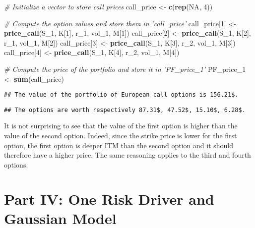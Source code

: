 \documentclass[]{article}
\newenvironment{Shaded}{\begin{snugshade}}{\end{snugshade}}
\newcommand{\CommentTok}[1]{\textcolor[rgb]{0.56,0.35,0.01}{\textit{#1}}}
\newcommand{\DecValTok}[1]{\textcolor[rgb]{0.00,0.00,0.81}{#1}}
\newcommand{\KeywordTok}[1]{\textcolor[rgb]{0.13,0.29,0.53}{\textbf{#1}}}
\newcommand{\NormalTok}[1]{#1}
\newcommand{\OtherTok}[1]{\textcolor[rgb]{0.56,0.35,0.01}{#1}}
\newcommand{\StringTok}[1]{\textcolor[rgb]{0.31,0.60,0.02}{#1}}
\begin{document}
\begin{Shaded}
\begin{Highlighting}[]
\CommentTok{# Initialize a vector to store call prices}
\NormalTok{call_price <-}\StringTok{ }\KeywordTok{c}\NormalTok{(}\KeywordTok{rep}\NormalTok{(}\OtherTok{NA}\NormalTok{, }\DecValTok{4}\NormalTok{))}

\CommentTok{# Compute the option values and store them in 'call_price'}
\NormalTok{call_price[}\DecValTok{1}\NormalTok{] <-}\StringTok{ }\KeywordTok{price_call}\NormalTok{(S_}\DecValTok{1}\NormalTok{, K[}\DecValTok{1}\NormalTok{], r_}\DecValTok{1}\NormalTok{, vol_}\DecValTok{1}\NormalTok{, M[}\DecValTok{1}\NormalTok{])}
\NormalTok{call_price[}\DecValTok{2}\NormalTok{] <-}\StringTok{ }\KeywordTok{price_call}\NormalTok{(S_}\DecValTok{1}\NormalTok{, K[}\DecValTok{2}\NormalTok{], r_}\DecValTok{1}\NormalTok{, vol_}\DecValTok{1}\NormalTok{, M[}\DecValTok{2}\NormalTok{])}
\NormalTok{call_price[}\DecValTok{3}\NormalTok{] <-}\StringTok{ }\KeywordTok{price_call}\NormalTok{(S_}\DecValTok{1}\NormalTok{, K[}\DecValTok{3}\NormalTok{], r_}\DecValTok{2}\NormalTok{, vol_}\DecValTok{1}\NormalTok{, M[}\DecValTok{3}\NormalTok{])}
\NormalTok{call_price[}\DecValTok{4}\NormalTok{] <-}\StringTok{ }\KeywordTok{price_call}\NormalTok{(S_}\DecValTok{1}\NormalTok{, K[}\DecValTok{4}\NormalTok{], r_}\DecValTok{2}\NormalTok{, vol_}\DecValTok{1}\NormalTok{, M[}\DecValTok{4}\NormalTok{])}

\CommentTok{# Compute the price of the portfolio and store it in 'PF_price_1'}
\NormalTok{PF_price_}\DecValTok{1}\NormalTok{ <-}\StringTok{ }\KeywordTok{sum}\NormalTok{(call_price)}
\end{Highlighting}
\end{Shaded}

\begin{verbatim}
## The value of the portfolio of European call options is 156.21$.
\end{verbatim}

\begin{verbatim}
## The options are worth respectively 87.31$, 47.52$, 15.10$, 6.28$.
\end{verbatim}

It is not surprising to see that the value of the first option is higher
than the value of the second option. Indeed, since the strike price is
lower for the first option, the first option is deeper ITM than the
second option and it should therefore have a higher price. The same
reasoning applies to the third and fourth options.

\hypertarget{part-iv-one-risk-driver-and-gaussian-model}{%
\section{Part IV: One Risk Driver and Gaussian
Model}\label{part-iv-one-risk-driver-and-gaussian-model}}
\end{document}
